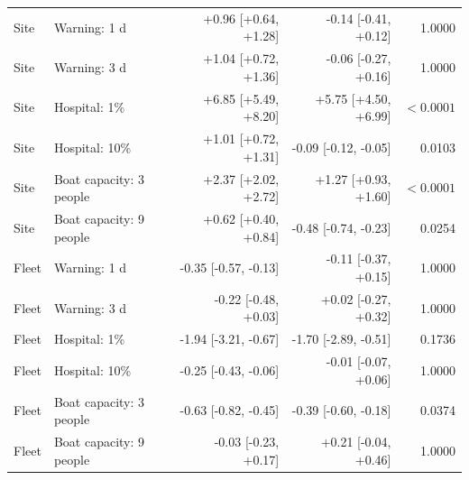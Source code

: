 \begin{tabular}{llrrr}
Site & Warning: 1 d & +0.96 [+0.64, +1.28] & -0.14 [-0.41, +0.12] & 1.0000 \\
Site & Warning: 3 d & +1.04 [+0.72, +1.36] & -0.06 [-0.27, +0.16] & 1.0000 \\
Site & Hospital: 1\% & +6.85 [+5.49, +8.20] & +5.75 [+4.50, +6.99] & $<0.0001$ \\
Site & Hospital: 10\% & +1.01 [+0.72, +1.31] & -0.09 [-0.12, -0.05] & 0.0103 \\
Site & Boat capacity: 3 people & +2.37 [+2.02, +2.72] & +1.27 [+0.93, +1.60] & $<0.0001$ \\
Site & Boat capacity: 9 people & +0.62 [+0.40, +0.84] & -0.48 [-0.74, -0.23] & 0.0254 \\
Fleet & Warning: 1 d & -0.35 [-0.57, -0.13] & -0.11 [-0.37, +0.15] & 1.0000 \\
Fleet & Warning: 3 d & -0.22 [-0.48, +0.03] & +0.02 [-0.27, +0.32] & 1.0000 \\
Fleet & Hospital: 1\% & -1.94 [-3.21, -0.67] & -1.70 [-2.89, -0.51] & 0.1736 \\
Fleet & Hospital: 10\% & -0.25 [-0.43, -0.06] & -0.01 [-0.07, +0.06] & 1.0000 \\
Fleet & Boat capacity: 3 people & -0.63 [-0.82, -0.45] & -0.39 [-0.60, -0.18] & 0.0374 \\
Fleet & Boat capacity: 9 people & -0.03 [-0.23, +0.17] & +0.21 [-0.04, +0.46] & 1.0000 \\
\bottomrule
\end{tabular}

